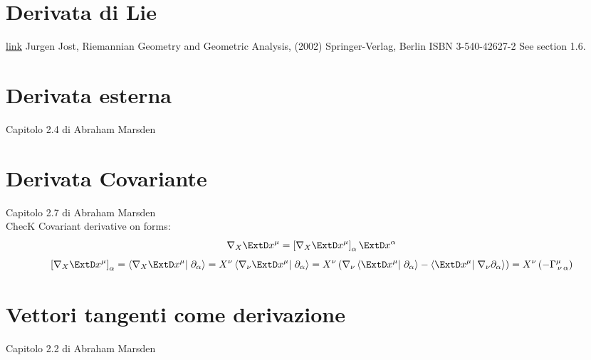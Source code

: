 \documentclass[a4paper,12pt]{scrartcl}    %
\begin{document}
\section{Derivata di Lie}
\href{run:d:~/Downloads/FoM2.pdf}{link}
Jurgen Jost, Riemannian Geometry and Geometric Analysis, (2002) Springer-Verlag, Berlin ISBN 3-540-42627-2 See section 1.6.



\section{Derivata esterna}
Capitolo 2.4 di Abraham Marsden

\section{Derivata Covariante}
Capitolo 2.7 di Abraham Marsden
		\\
 		ChecK Covariant derivative on forms:
		\begin{displaymath}
			\nabla_X \ExtD x^\mu = \left[ \nabla_X \ExtD x^\mu \right]_\alpha \ExtD x^\alpha
		\end{displaymath}
		\begin{displaymath}
			\left[ \nabla_X \ExtD x^\mu \right]_\alpha =
			\left\langle \nabla_X \ExtD x^\mu  \right\vert \left. \partial_\alpha \right\rangle =
			X^\nu \left\langle \nabla_\nu \ExtD x^\mu  \right\vert \left. \partial_\alpha \right\rangle =			
			X^\nu \left(\nabla_\nu\left \langle  \ExtD x^\mu  \right\vert \left. \partial_\alpha \right\rangle - \left\langle \ExtD x^\mu  \right\vert \left. \nabla_\nu \partial_\alpha \right\rangle \right) =	
			X^\nu \left( - \Gamma^\mu_{\, \nu \, \alpha} \right)
		\end{displaymath}   

\section{Vettori tangenti come derivazione}
Capitolo 2.2 di Abraham Marsden
\end{document}
